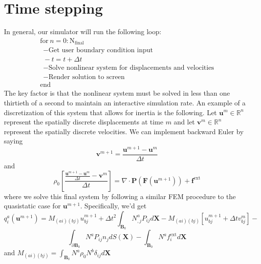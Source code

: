 \section*{Time stepping}
In general, our simulator will run the following loop:
$$
\begin{array}{lc}
\textrm{for} \ n=0:\textrm{N}_\textrm{final}\\
\ \ -\textrm{Get user boundary condition input}\\
\ \ -t=t+\Delta{t}\\
\ \ -\textrm{Solve nonlinear system for displacements and velocities}\\
\ \ -\textrm{Render solution to screen}\\
\textrm{end}
 \end{array}
$$
The key factor is that the nonlinear system must be solved in less than one thirtieth of a second to maintain an interactive simulation rate. An example of a discretization of this system that allows for inertia is the following. Let $\mathbf{u}^m\in\mathbb{R}^n$ represent the spatially discrete displacements at time $m$ and let $\mathbf{v}^m\in\mathbb{R}^n$ represent the spatially discrete velocities. We can implement backward Euler by saying
$$
\mathbf{v}^{m+1}=\frac{\mathbf{u}^{m+1}-\mathbf{u}^{m}}{\Delta{t}}
$$
and
$$
\rho_0\left[\frac{\frac{\mathbf{u}^{m+1}-\mathbf{u}^{m}}{\Delta{t}}-\mathbf{v}^{m}}{\Delta{t}}\right]=\nabla\cdot\mathbf{P}(\mathbf{F}(\mathbf{u}^{m+1}))+\mathbf{f}^\textrm{ext}
$$
where we solve this final system by following a similar FEM procedure to the quasistatic case for $\mathbf{u}^{m+1}$. Specifically, we'd get 
$$
q^a_i(\mathbf{u}^{m+1})=M_{(ai)(bj)}u^{m+1}_{bj}+\Delta{t}^2\int_{\mathbf{B}_0}N^a_{,j}P_{ij}d\mathbf{X}-M_{(ai)(bj)}\left[u^{m+1}_{bj}+\Delta{t}v^{m}_{bj}\right]-
$$
$$
\int_{\partial\mathbf{B}_0}N^aP_{ij}n_jdS(\mathbf{X})-\int_{\mathbf{B}_0}N^af^\textrm{ext}_id\mathbf{X}
$$
and $M_{(ai)(bj)}=\int_{\mathbf{B}_0}N^a\rho_0N^b\delta_{ij}d\mathbf{X}$
